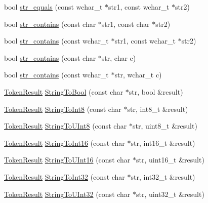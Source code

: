 \begin{DoxyCompactItemize}
\item 
bool \hyperlink{namespacemage_a0013423e891bc8f522248a6a3f826681}{str\+\_\+equals} (const wchar\+\_\+t $\ast$str1, const wchar\+\_\+t $\ast$str2)
\item 
bool \hyperlink{namespacemage_a5194c40ccd591a8a8926ad7812abcd09}{str\+\_\+contains} (const char $\ast$str1, const char $\ast$str2)
\item 
bool \hyperlink{namespacemage_aac9609117e428765417683338ae8fa73}{str\+\_\+contains} (const wchar\+\_\+t $\ast$str1, const wchar\+\_\+t $\ast$str2)
\item 
bool \hyperlink{namespacemage_a42025161321117689362691b52994c3f}{str\+\_\+contains} (const char $\ast$str, char c)
\item 
bool \hyperlink{namespacemage_a95501f17ace9d4f4ca8ed15e2559ad23}{str\+\_\+contains} (const wchar\+\_\+t $\ast$str, wchar\+\_\+t c)
\item 
\hyperlink{namespacemage_a2178ba2411db5912f41b2e7698c2037d}{Token\+Result} \hyperlink{namespacemage_a4936774f925ba96c5b8d37c5e54cca02}{String\+To\+Bool} (const char $\ast$str, bool \&result)
\item 
\hyperlink{namespacemage_a2178ba2411db5912f41b2e7698c2037d}{Token\+Result} \hyperlink{namespacemage_ab7990acb6c8fb8e5eb578ef173e601f9}{String\+To\+Int8} (const char $\ast$str, int8\+\_\+t \&result)
\item 
\hyperlink{namespacemage_a2178ba2411db5912f41b2e7698c2037d}{Token\+Result} \hyperlink{namespacemage_ad3cfd1fdffefa1f3f793b7612de11770}{String\+To\+U\+Int8} (const char $\ast$str, uint8\+\_\+t \&result)
\item 
\hyperlink{namespacemage_a2178ba2411db5912f41b2e7698c2037d}{Token\+Result} \hyperlink{namespacemage_a5889574dc8d73ffa614ad8541e0b312a}{String\+To\+Int16} (const char $\ast$str, int16\+\_\+t \&result)
\item 
\hyperlink{namespacemage_a2178ba2411db5912f41b2e7698c2037d}{Token\+Result} \hyperlink{namespacemage_aa1be9dbfa0799457b0de019d451cd5ca}{String\+To\+U\+Int16} (const char $\ast$str, uint16\+\_\+t \&result)
\item 
\hyperlink{namespacemage_a2178ba2411db5912f41b2e7698c2037d}{Token\+Result} \hyperlink{namespacemage_a805f1cf7436782f77b49085194451d07}{String\+To\+Int32} (const char $\ast$str, int32\+\_\+t \&result)
\item 
\hyperlink{namespacemage_a2178ba2411db5912f41b2e7698c2037d}{Token\+Result} \hyperlink{namespacemage_ac4f6357454f6870506e0fc102b745281}{String\+To\+U\+Int32} (const char $\ast$str, uint32\+\_\+t \&result)

\end{DoxyCompactItemize}
